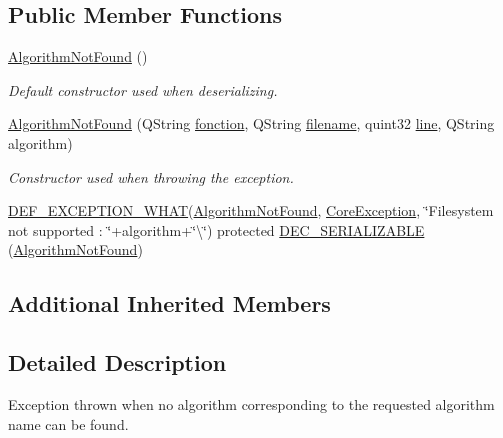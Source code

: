 \subsection*{Public Member Functions}
\begin{DoxyCompactItemize}
\item 
\hyperlink{class_gost_crypt_1_1_core_1_1_algorithm_not_found_a247628cd29e32892f5f9af858cc9b169}{Algorithm\+Not\+Found} ()
\begin{DoxyCompactList}\small\item\em Default constructor used when deserializing. \end{DoxyCompactList}\item 
\hyperlink{class_gost_crypt_1_1_core_1_1_algorithm_not_found_a133f8af7c5134e8bf5a60ed6dc9909cd}{Algorithm\+Not\+Found} (Q\+String \hyperlink{class_gost_crypt_1_1_gost_crypt_exception_a29b8c93d5efbb1ff369107385725a939}{fonction}, Q\+String \hyperlink{class_gost_crypt_1_1_gost_crypt_exception_a749a12375f4ba9d502623b99d8252f38}{filename}, quint32 \hyperlink{class_gost_crypt_1_1_gost_crypt_exception_abf506d911f12a4e969eea500f90bd32c}{line}, Q\+String algorithm)
\begin{DoxyCompactList}\small\item\em Constructor used when throwing the exception. \end{DoxyCompactList}\item 
\hyperlink{_gost_crypt_exception_8h_a5bc1e1c6c9d6f46c84eeba49e33355f9}{D\+E\+F\+\_\+\+E\+X\+C\+E\+P\+T\+I\+O\+N\+\_\+\+W\+H\+AT}(\hyperlink{class_gost_crypt_1_1_core_1_1_algorithm_not_found}{Algorithm\+Not\+Found}, \hyperlink{class_gost_crypt_1_1_core_1_1_core_exception}{Core\+Exception}, \char`\"{}Filesystem not supported \+: \char`\"{}+algorithm+\char`\"{}\textbackslash{}\char`\"{}) protected \hyperlink{class_gost_crypt_1_1_core_1_1_algorithm_not_found_aa2a4d0be2027881bcf6ad08aba9ed215}{D\+E\+C\+\_\+\+S\+E\+R\+I\+A\+L\+I\+Z\+A\+B\+LE} (\hyperlink{class_gost_crypt_1_1_core_1_1_algorithm_not_found}{Algorithm\+Not\+Found})
\end{DoxyCompactItemize}
\subsection*{Additional Inherited Members}


\subsection{Detailed Description}
Exception thrown when no algorithm corresponding to the requested algorithm name can be found. 

